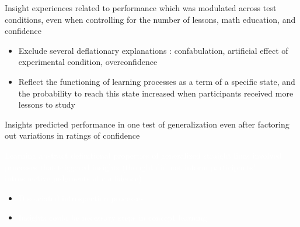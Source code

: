 \documentclass[11pt]{beamer}
\begin{document}
                    \begin{frame}

                      Insight experiences related to performance which was modulated across test conditions,
                      even when controlling for the number of lessons, math education, and confidence

                      \begin{itemize}

                       \item{ Exclude several deflationary explanations : confabulation, artificial effect of experimental condition, overconfidence}

                     \item{ Reflect the functioning of learning processes as a term of a specific state, and the probability to reach this state increased when participants received more lessons to study}
                       \end{itemize}


                    \end{frame}




                     \begin{frame}
                      
                      Insights predicted performance in one test of generalization even after factoring out variations in ratings of confidence

                      \textcolor{white}{Learning abstract definitional properties of generalized straight lines involved processes that triggered  insights (thought did not inform participants’ introspective judgments of confidence)}

                      \begin{itemize}

                      \item{\textcolor{white}{Dissociated introspection processes }}

                      \item{\textcolor{white}{Insights could be necessary steps in concept learning }}

                      \end{itemize}


                    \end{frame}
\end{document}
